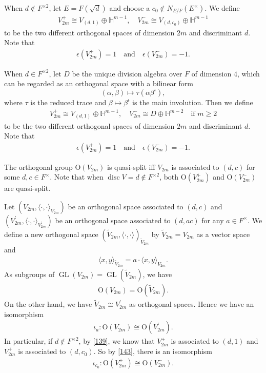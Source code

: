 \documentclass[article]{article}
\numberwithin{equation}{section}
\theoremstyle{definition}
\DeclareMathOperator{\GL}{GL}
\DeclareMathOperator{\disc}{disc}
\begin{document}
When $d \notin F^{\times 2}$, let $E=F(\sqrt{d})$ and choose a $c_0\notin N_{E/F}(E^\times)$. We define
\begin{align}\label{139}
V_{2m}^+\cong V_{(d,1)}\oplus \mathbb H^{m-1},\quad 
V_{2m}^-\cong V_{(d,c_0)}\oplus \mathbb H^{m-1}
\end{align}
to be the two different orthogonal spaces of dimension $2m$ and discriminant $d$. Note that  
\begin{align*}
\epsilon(V_{2m}^+)=1\quad \mbox{and}\quad  \epsilon(V_{2m}^-)=-1.
\end{align*}

When $d \in F^{ \times 2}$, let $D$ be the unique division algebra over $F$ of dimension $4$, which can be regarded as an orthogonal space with a bilinear form
$$(\alpha, \beta) \mapsto \tau\left(\alpha \beta^{\iota}\right),$$
where $\tau$ is the reduced trace and $\beta \mapsto \beta^{\iota}$ is the main involution. Then we define  
\begin{align}\label{140}
V_{2m}^+\cong V_{(d,1)}\oplus \mathbb H^{m-1}, \quad 
V_{2m}^-\cong D\oplus \mathbb H^{m-2} \quad \mbox{if $m\geq 2$}
\end{align} 
to be the two different orthogonal spaces of dimension $2m$ and discriminant $d$. Note that  
\begin{align*}
\epsilon(V_{2m}^+)=1\quad \mbox{and}\quad \epsilon(V_{2m}^-)=-1. 
\end{align*}


The orthogonal group $\mathrm{O}\left(V_{2 m}\right)$ is quasi-split iff $V_{2m}$ is associated to $(d,c)$ for some $d,c\in F^\times$. Note that when $\disc V=d \notin F^{\times 2}$, both $\mathrm O(V_{2m}^+)$ and $\mathrm O(V_{2m}^-)$ are quasi-split.

Let $(V_{2m},\langle\cdot,\cdot\rangle_{V_{2m}})$ be an orthogonal space associated to $(d,c)$ and $(V_{2m}^\prime,\langle\cdot,\cdot\rangle_{V_{2m}^\prime})$ be an orthogonal space associated to $(d,ac)$ for any $a\in F^{\times}$. We define a new orthogonal space $(\widetilde{V}_{2m},\langle\cdot,\cdot\rangle)_{\widetilde {V}_{2m}}$ by $\widetilde{V}_{2m}=V_{2m}$ as a vector space and 
\begin{align*}
\langle x, y\rangle_{\widetilde {V}_{2m}}= a\cdot \langle x,y\rangle_{V_{2m}}. 
\end{align*}
As subgroups of $\GL(V_{2m})=\GL(\widetilde{V}_{2m})$, we have
\begin{align*}
\mathrm O(V_{2m})=\mathrm O(\widetilde{V}_{2m}). 
\end{align*}
On the other hand, we have $\widetilde{V}_{2m}\cong V_{2m}^\prime$ as  orthogonal spaces. Hence we have an isomorphism 
\begin{align}\label{143}
\iota_a: \mathrm O(V_{2m}) \cong \mathrm O(V_{2m}^\prime). 
\end{align} 
In particular, if $d\notin F^{\times 2}$, by \ref{139}, we know that $V_{2m}^+$ is associated to $(d,1)$ and $V_{2m}^+$ is associated to $(d,c_0)$. So by \ref{143}, there is an isomorphism 
\begin{align}\label{141}
\iota_{c_0}: \mathrm O(V_{2m}^+)\cong \mathrm O(V_{2m}^-). 
\end{align}
\end{document}
